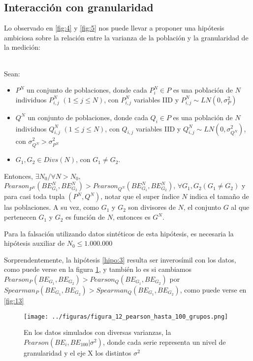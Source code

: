 \subsection{Interacción con granularidad}

Lo observado en \ref{fig:4} y \ref{fig:5} nos puede llevar a proponer una hipótesis ambiciosa sobre la relación entre la varianza de la población y la granularidad de la medición:

\begin{hipotesis}\label{hipo:3}
    \\

    Sean:

    \begin{itemize}
    \item $P^N$ un conjunto de poblaciones, donde cada $P^N_i \in P$ es una población de $N$ individuos $P^N_{i,j}$ $(1 \leq j \leq N)$, con $P^N_{i,j}$ variables IID y $P^N_{i,j} \sim LN(0,\sigma_P^2)$ 
    \item $Q^N$ un conjunto de poblaciones, donde cada $Q_i \in P$ es una población de $N$ individuos $Q^N_{i,j}$ $(1 \leq j \leq N)$, con $Q_{i,j}$ variables IID y $Q^N_{i,j} \sim LN(0,\sigma_{Q^N}^2)$, con $\sigma_{Q^N}^2 > \sigma_{P^N}^2$
    \item $G_1, G_2 \in Divs(N)$, con $G_1 \neq G_2$.
    \end{itemize}

    
    Entonces, $\exists N_0/ \forall N > N_0, $ $Pearson_{P^N}(BE^N_{G_1},BE^N_{G_2}) > Pearson_{Q^N}(BE^N_{G_1}, BE^N_{G_2})$, $\forall G_1, G_2 (G_1 \neq G_2)$ y para casi toda tupla $(P^N,Q^N)$, notar que el super índice $N$ indica el tamaño de las poblaciones. A su vez, como $G_1$ y $G_2$ son divisores de $N$, el conjunto $G$ al que pertenecen $G_1$ y $G_2$ es función de $N$, entonces es $G^N$.
    

    Para la falsación utilizando datos sintéticos de esta hipótesis, es necesaria la hipótesis auxiliar de $N_0 \leq 1.000.000$
\end{hipotesis}

Sorprendentemente, la hipótesis \ref{hipo:3} resulta ser inverosímil con los datos, como puede verse en la figura \ref{fig:12}, y también lo es si cambiamos $Pearson_P(BE_{G_1},BE_{G_2}) > Pearson_Q(BE_{G_1}, BE_{G_2})$ por $Spearman_P(BE_{G_1},BE_{G_2}) > Spearman_Q(BE_{G_1}, BE_{G_2})$, como puede verse en \ref{fig:13}

\begin{figure}[H]
    \centering 
    \texttt{[image: ../figuras/figura\_12\_pearson\_hasta\_100\_grupos.png]} 
    \caption{En los datos simulados con diversas varianzas, la $Pearson(BE_i,BE_{100} | \sigma^2)$, donde cada serie representa un nivel de granularidad y el eje X los distintos $\sigma^2$}
    \label{fig:12}
\end{figure}

